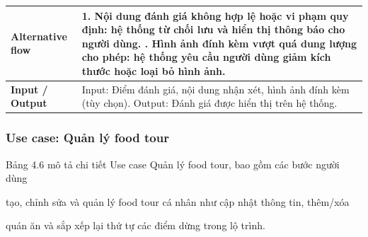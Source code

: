 \begin{longtable}{|p{4cm}|p{10cm}|}
\textbf{Alternative flow} &
1. Nội dung đánh giá không hợp lệ hoặc vi phạm quy định: hệ thống từ chối lưu và hiển thị thông báo cho người dùng. \newline 2. Hình ảnh đính kèm vượt quá dung lượng cho phép: hệ thống yêu cầu người dùng giảm kích thước hoặc loại bỏ hình ảnh. \\
\hline

\textbf{Input / Output} &
Input: Điểm đánh giá, nội dung nhận xét, hình ảnh đính kèm (tùy chọn). \newline Output: Đánh giá được hiển thị trên hệ thống. \\
\hline

\end{longtable}
\endgroup



\subsubsection{Use case: Quản lý food tour}

Bảng 4.6 mô tả chi tiết Use case Quản lý food tour, bao gồm các bước người dùng

tạo, chỉnh sửa và quản lý food tour cá nhân như cập nhật thông tin, thêm/xóa

quán ăn và sắp xếp lại thứ tự các điểm dừng trong lộ trình.



